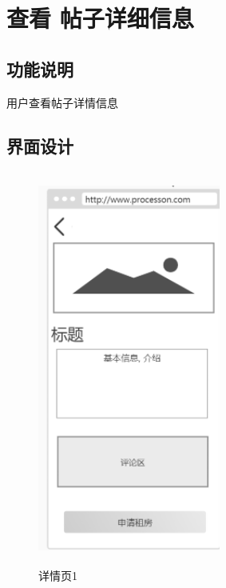 \newpage
 

\section{查看 帖子详细信息}

\subsection{功能说明}
用户查看帖子详情信息
\subsection{界面设计}
\begin{figure}[htbp]
    \centering
    \begin{minipage}[t]{0.48\textwidth}
    \centering
    \includegraphics[width=6cm,height=13cm]{design/image/xiangqing.png} 
    \caption{详情页1}
    \end{minipage}
    \begin{minipage}[t]{0.48\textwidth}
    \centering

\end{minipage}
\end{figure}
